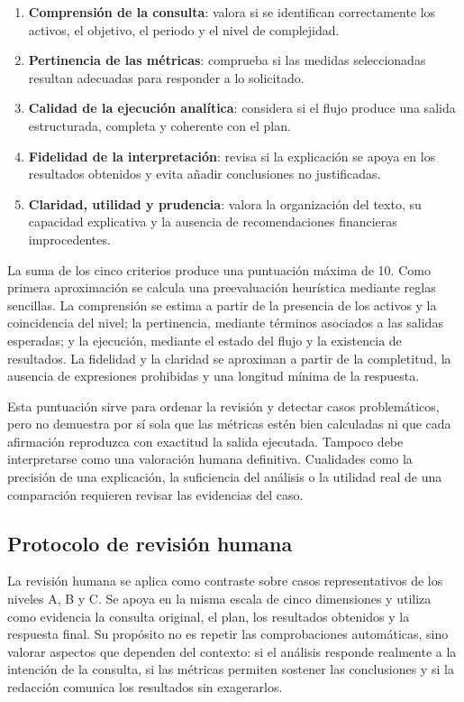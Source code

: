 \begin{enumerate}
    \item \textbf{Comprensión de la consulta}: valora si se identifican correctamente los activos, el objetivo, el periodo y el nivel de complejidad.
    \item \textbf{Pertinencia de las métricas}: comprueba si las medidas seleccionadas resultan adecuadas para responder a lo solicitado.
    \item \textbf{Calidad de la ejecución analítica}: considera si el flujo produce una salida estructurada, completa y coherente con el plan.
    \item \textbf{Fidelidad de la interpretación}: revisa si la explicación se apoya en los resultados obtenidos y evita añadir conclusiones no justificadas.
    \item \textbf{Claridad, utilidad y prudencia}: valora la organización del texto, su capacidad explicativa y la ausencia de recomendaciones financieras improcedentes.
\end{enumerate}

La suma de los cinco criterios produce una puntuación máxima de 10. Como primera aproximación se calcula una preevaluación heurística mediante reglas sencillas. La comprensión se estima a partir de la presencia de los activos y la coincidencia del nivel; la pertinencia, mediante términos asociados a las salidas esperadas; y la ejecución, mediante el estado del flujo y la existencia de resultados. La fidelidad y la claridad se aproximan a partir de la completitud, la ausencia de expresiones prohibidas y una longitud mínima de la respuesta.

Esta puntuación sirve para ordenar la revisión y detectar casos problemáticos, pero no demuestra por sí sola que las métricas estén bien calculadas ni que cada afirmación reproduzca con exactitud la salida ejecutada. Tampoco debe interpretarse como una valoración humana definitiva. Cualidades como la precisión de una explicación, la suficiencia del análisis o la utilidad real de una comparación requieren revisar las evidencias del caso.

\subsection{Protocolo de revisión humana}

La revisión humana se aplica como contraste sobre casos representativos de los niveles A, B y C. Se apoya en la misma escala de cinco dimensiones y utiliza como evidencia la consulta original, el plan, los resultados obtenidos y la respuesta final. Su propósito no es repetir las comprobaciones automáticas, sino valorar aspectos que dependen del contexto: si el análisis responde realmente a la intención de la consulta, si las métricas permiten sostener las conclusiones y si la redacción comunica los resultados sin exagerarlos.


